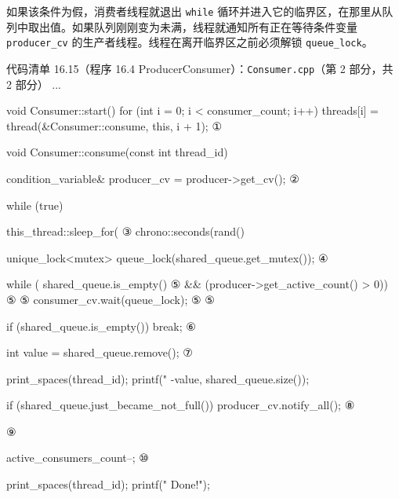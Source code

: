 如果该条件为假，消费者线程就退出 \texttt{while} 循环并进入它的临界区，在那里从队列中取出值。如果队列刚刚变为未满，线程就通知所有正在等待条件变量 \texttt{producer\_\allowbreak{}cv} 的生产者线程。线程在离开临界区之前必须解锁 \texttt{queue\_\allowbreak{}lock}。

\begin{codeboxt}{代码清单 16.15（程序 16.4 ProducerConsumer）：\texttt{Consumer.\allowbreak{}cpp}（第 2 部分，共 2 部分）}
...

void Consumer::start()
{
    for (int i = 0; i < consumer_count; i++)
    {
        threads[i] = thread(&Consumer::consume, this, i + 1);       ①
    }
}

void Consumer::consume(const int thread_id)
{
    condition_variable& producer_cv = producer->get_cv();            ②

    while (true)
    {
        this_thread::sleep_for(                                      ③
                            chrono::seconds(rand()%
        {
            unique_lock<mutex> queue_lock(shared_queue.get_mutex()); ④

            {
                while (   shared_queue.is_empty()                    ⑤
                       && (producer->get_active_count() > 0))        ⑤
                {                                                    ⑤
                   consumer_cv.wait(queue_lock);                     ⑤
                }                                                    ⑤

                if (shared_queue.is_empty()) break;                  ⑥

                int value = shared_queue.remove();                   ⑦

                print_spaces(thread_id);
                printf("%
                       -value, shared_queue.size());

                if (shared_queue.just_became_not_full())
                {
                    producer_cv.notify_all();                        ⑧
                }
            }
        }                                                            ⑨
    }

    active_consumers_count--;                                        ⑩

    print_spaces(thread_id);
    printf("   Done!\n");
}
\end{codeboxt}
\par
{}\par
